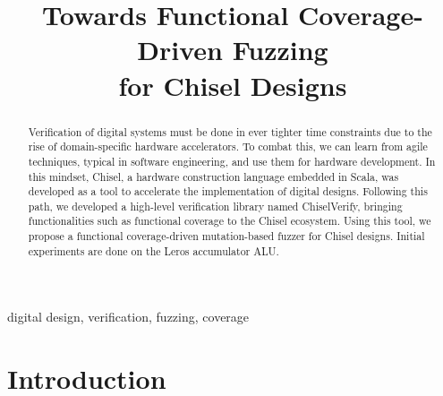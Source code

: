 \documentclass[conference]{IEEEtran}
\begin{document}

\title{Towards Functional Coverage-Driven Fuzzing\\ for Chisel Designs}

\author{


}


\maketitle \thispagestyle{empty}

\begin{abstract}

Verification of digital systems must be done in ever tighter time constraints due to the rise of domain-specific hardware accelerators.
To combat this, we can learn from agile techniques, typical in software engineering, and use them for hardware development.
In this mindset, Chisel, a hardware construction language embedded in Scala, was developed as a tool to accelerate the implementation of digital designs.
Following this path, we developed a high-level verification library named ChiselVerify, bringing functionalities such as functional coverage to the Chisel ecosystem.
Using this tool, we propose a functional coverage-driven mutation-based fuzzer for Chisel designs.
Initial experiments are done on the Leros accumulator ALU.

\end{abstract}

\begin{IEEEkeywords}
digital design, verification, fuzzing, coverage
\end{IEEEkeywords}
\section{Introduction}
\label{sec:intro}
\end{document}
